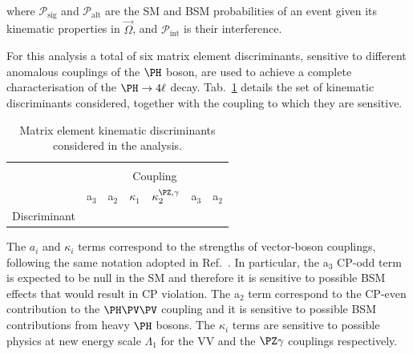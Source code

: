 where $\mathcal{P}_{\text{sig}}$ and $\mathcal{P}_{\text{alt}}$ are the SM and BSM probabilities of an event given its kinematic properties in $\vec\Omega$, and $\mathcal{P}_{\text{int}}$ is their interference. 

For this analysis a total of six matrix element discriminants, sensitive to different anomalous couplings of the $\PH$ boson, are used to achieve a complete characterisation of the $\PH\to4\ell$ decay.
Tab.~\ref{tab:MEdiscriminants} details the set of kinematic discriminants considered, together with the coupling to which they are sensitive.

\begin{table}[tbp]
	\centering 
	\caption{Matrix element kinematic discriminants considered in the analysis.}
	\renewcommand{\arraystretch}{1.5}
	\begin{tabular}{ ccccc|cc  }
		& \multicolumn{4}{c}{\Dalt}& \multicolumn{2}{c}{\Dint} \\
		\cline{2-7}
		& \multicolumn{6}{c}{Coupling} \\
		& a$_3$ & a$_2$ & $\kappa_1$ & $\kappa_2^{\PZ,\gamma}$ & a$_3$ & a$_2$ \\
		Discriminant & \Dzm & \Dzhp & \DLone & \DLoneZg & \DCP & \Dint \\
	\end{tabular}
	\label{tab:MEdiscriminants}
\end{table}

The $a_i$  and $\kappa_i$ terms correspond to the strengths of vector-boson couplings, following the same notation adopted in Ref.~\cite{CMSHIG19009}.
In particular, the  a$_3$ CP-odd term is expected to be null in the SM and therefore it is sensitive to possible BSM effects that would result in CP violation.
The a$_2$ term correspond to the CP-even contribution to the $\PH\PV\PV$ coupling and it is sensitive to possible BSM contributions from heavy $\PH$ bosons.
The $\kappa_i$ terms are sensitive to possible physics at new energy scale $\Lambda_{1}$ for the VV and the $\PZ \gamma$ couplings respectively.

